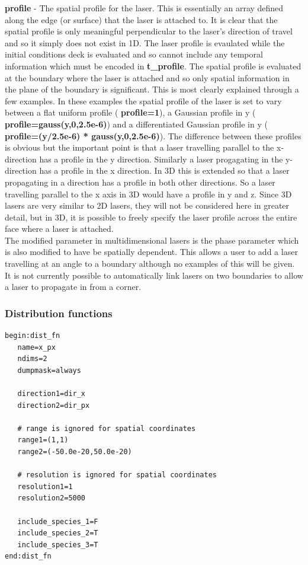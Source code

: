 \documentclass[12pt,a4paper]{article}
\newcommand{\emphtext}{\color{warwickdark} \fontfamily{phv}\selectfont\Large\bf}
\newcommand{\boxverbatim}[1]{\begin{Verbatim}[obeytabs=true,frame=single,
  framerule=0.5mm,rulecolor=\color{warwickmid},formatcom=\color{black},label=#1]}
\newcommand{\inlineemph}[1]{{\color{warwicklight} \bf{#1}}}
\begin{document}
{\emphtext profile} - The spatial profile for the laser. This is
essentially an array defined along the edge (or surface) that the laser is
attached to. It is clear that the spatial profile is only meaningful
perpendicular to the laser's direction of travel and so it simply does not
exist in 1D. The laser profile is evaulated while the initial conditions deck
is evaluated and so cannot include any temporal information which must be
encoded in \inlineemph{t\_profile}.  The spatial profile is evaluated at the
boundary where the laser is attached and so only spatial information in the
plane of the boundary is significant. This is most clearly explained through a
few examples. In these examples the spatial profile of the laser is set to vary
between a flat uniform profile (\inlineemph{profile=1}), a Gaussian profile in
y (\inlineemph{profile=gauss(y,0,2.5e-6)}) and a differentiated Gaussian
profile in y (\inlineemph{profile=(y/2.5e-6) * gauss(y,0,2.5e-6)}). The
difference between these profiles is obvious but the important point is that a
laser travelling parallel to the x-direction has a profile in the y
direction. Similarly a laser progagating in the y-direction has a profile in
the x direction. In 3D this is extended so that a laser propagating in a
direction has a profile in both other directions. So a laser travelling
parallel to the x axis in 3D would have a profile in y and z. Since 3D lasers
are very similar to 2D lasers, they will not be considered here in greater
detail, but in 3D, it is possible to freely specify the laser profile across
the entire face where a laser is attached.\\

The modified parameter in
multidimensional lasers is the phase parameter which is also modified to have
be spatially dependent. This allows a user to add a laser travelling at an
angle to a boundary although no examples of this will be given. It is not
currently possible to automatically link lasers on two boundaries to allow a
laser to propagate in from a corner.\\

\subsubsection{Distribution functions}
%
\begin{minipage}{\textwidth}
\boxverbatim{dist\_fn block}
begin:dist_fn
   name=x_px
   ndims=2
   dumpmask=always

   direction1=dir_x
   direction2=dir_px

   # range is ignored for spatial coordinates
   range1=(1,1)
   range2=(-50.0e-20,50.0e-20)

   # resolution is ignored for spatial coordinates
   resolution1=1
   resolution2=5000

   include_species_1=F
   include_species_2=T
   include_species_3=T
end:dist_fn
\end{Verbatim}
\end{minipage}
\end{document}
